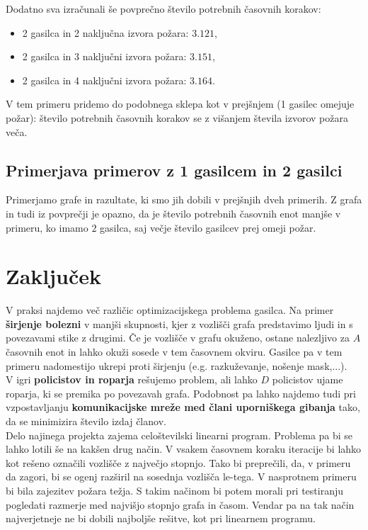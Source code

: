 \documentclass[a4paper, 12pt]{article}
\begin{document}
\begin{figure}[!htb]
    \endminipage
\end{figure}

\pagebreak

\noindent Dodatno sva izračunali še povprečno število potrebnih časovnih korakov:
\begin{itemize}
    \item 2 gasilca in 2 naključna izvora požara: $3.121$,
    \item 2 gasilca in 3 naključni izvora požara: $3.151$,
    \item 2 gasilca in 4 naključni izvora požara: $3.164$.
\end{itemize}

\noindent V tem primeru pridemo do podobnega sklepa kot v prejšnjem (1 gasilec omejuje požar):
število potrebnih časovnih korakov se z višanjem števila izvorov požara veča. 

\subsection{Primerjava primerov z 1 gasilcem in 2 gasilci}
Primerjamo grafe in razultate, ki smo jih dobili v prejšnjih dveh primerih.
Z grafa in tudi iz povprečji je opazno, da je število potrebnih časovnih enot manjše v primeru, ko
imamo $2$ gasilca, saj večje število gasilcev prej omeji požar. 

\pagebreak
\section{Zaključek}

V praksi najdemo več različic optimizacijskega problema gasilca. Na primer
\textbf{širjenje bolezni} v manjši skupnosti, kjer z vozlišči grafa predstavimo ljudi 
in s povezavami stike z drugimi. Če je vozlišče v grafu okuženo, ostane nalezljivo 
za $A$ časovnih enot in lahko okuži sosede v tem časovnem okviru. Gasilce pa v tem
primeru nadomestijo ukrepi proti širjenju (e.g. razkuževanje, nošenje mask,...). \\
V igri \textbf{policistov in roparja} rešujemo problem, ali lahko $D$ policistov ujame roparja, ki se 
premika po povezavah grafa. 
Podobnost pa lahko najdemo tudi pri vzpostavljanju \textbf{komunikacijske mreže med člani uporniškega gibanja}
tako, da se minimizira število izdaj članov. \\

\noindent Delo najinega projekta zajema celoštevilski linearni program. Problema pa bi se lahko lotili še
na kakšen drug način. V vsakem časovnem koraku iteracije bi lahko kot rešeno označili vozlišče z 
največjo stopnjo. Tako bi preprečili, da, v primeru da zagori, bi se ogenj razširil na sosednja vozlišča
le-tega. V nasprotnem primeru bi bila zajezitev požara težja. 
S takim načinom bi potem morali pri testiranju pogledati razmerje med najvišjo stopnjo 
grafa in časom. Vendar pa na tak način najverjetneje ne bi dobili najboljše
rešitve, kot pri linearnem programu. 
% 
% 

\end{document}
